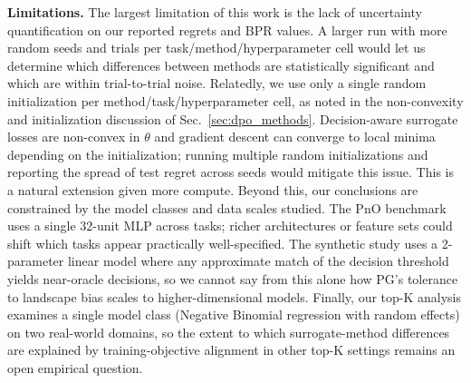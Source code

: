 \textbf{Limitations.} The largest limitation of this work is the lack of uncertainty quantification on our reported regrets and BPR values. A larger run with more random seeds and trials per task/method/hyperparameter cell would let us determine which differences between methods are statistically significant and which are within trial-to-trial noise. Relatedly, we use only a single random initialization per method/task/hyperparameter cell, as noted in the non-convexity and initialization discussion of Sec.~\ref{sec:dpo_methods}. Decision-aware surrogate losses are non-convex in $\theta$ and gradient descent can converge to local minima depending on the initialization; running multiple random initializations and reporting the spread of test regret across seeds would mitigate this issue. This is a natural extension given more compute. Beyond this, our conclusions are constrained by the model classes and data scales studied. The PnO benchmark uses a single 32-unit MLP across tasks; richer architectures or feature sets could shift which tasks appear practically well-specified. The synthetic study uses a 2-parameter linear model where any approximate match of the decision threshold yields near-oracle decisions, so we cannot say from this alone how PG's tolerance to landscape bias scales to higher-dimensional models. Finally, our top-K analysis examines a single model class (Negative Binomial regression with random effects) on two real-world domains, so the extent to which surrogate-method differences are explained by training-objective alignment in other top-K settings remains an open empirical question.